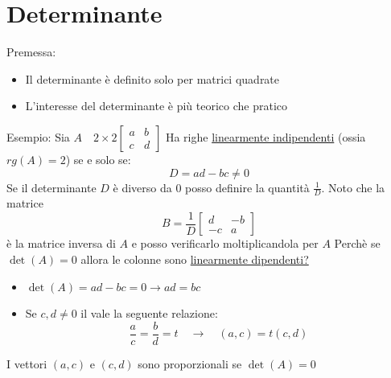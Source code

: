 \section{Determinante}
Premessa:
\begin{itemize}
	\item Il determinante è definito solo per matrici quadrate
	\item L'interesse del determinante è più teorico che pratico
\end{itemize}
Esempio:
Sia $A \quad 2 \times 2
	\begin{bmatrix}
		a & b \\
		c & d
	\end{bmatrix}
$
Ha righe \underline{linearmente indipendenti} (ossia $rg\left( A \right) =2$) se e solo se:
\[
	D=ad-bc \neq 0
\]
Se il determinante $D$ è diverso da 0 posso definire la quantità $\frac{1}{D}$. Noto che la matrice
\[
	B=\frac{1}{D}\begin{bmatrix} d & -b \\ -c & a \end{bmatrix}
\]
è la matrice inversa di $A$ e posso verificarlo moltiplicandola per $A$
\hr
Perchè se $ \det\left( A \right) = 0 $ allora le colonne sono \underline{linearmente dipendenti?}
\begin{itemize}
	\item $ \det\left( A \right) = ad-bc = 0  \rightarrow ad= bc$
	\item 	Se $ c, d \neq 0 $ il vale la seguente relazione:
	      \[
		      \frac{a}{c}=\frac{b}{d} = t \quad \rightarrow \quad \left( a,c \right) = t\left( c,d \right)
	      \]
\end{itemize}
I vettori $ \left( a,c \right)  $ e $ \left( c,d \right)  $ sono proporzionali se $ \det\left( A \right) =  0  $

